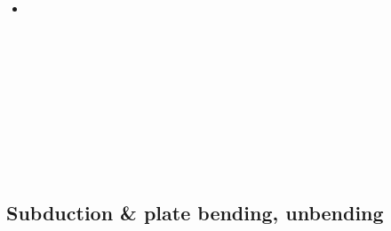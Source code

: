 \begin{scriptsize}
\begin{itemize}
\textcite{befd21} \\
\textcite{chcg21} \\
\textcite{kifc21} \\
\textcite{zhle21} \\
\textcite{bafu21} \\
\textcite{kekg21} \\
\textcite{enma21} \\
\textcite{hoco21} \\
\textcite{resr21} \\
\textcite{gupg21b} \\
\textcite{ligl21b} \\
\textcite{gebb21} \\
\textcite{brbf21} \\
\textcite{chri21} \\
\textcite{diha21} \\

\item[\twothousandtwentytwo] 
\textcite{scva22} \\
\textcite{alrr22a} \\
\textcite{alrr22b} \\
\textcite{behb22} \\
\textcite{erhf22} \\
\textcite{yacz22} \\
\textcite{liya22} \\
\textcite{pusk22} \\
\textcite{lala22} \\
\textcite{cesg22} \\

\end{itemize}
\end{scriptsize}

\subsection{Subduction \& plate bending, unbending}

